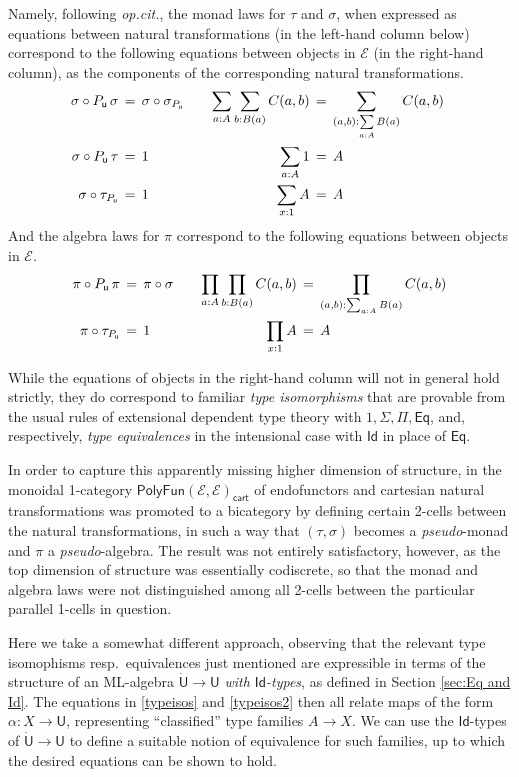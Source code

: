 \documentclass[12pt,reqno]{amsart}
\newcommand{\EE}{\ensuremath{\mathcal{E}}}
\renewcommand{\to}{\ensuremath{\rightarrow}}
\newcommand{\Id}{\mathsf{Id}}
\renewcommand{\t}{\ensuremath{\mathsf{u}}}
\newcommand{\T}{\ensuremath{\mathsf{U}}}
\newcommand{\TT}{\ensuremath{\dot{\mathsf{U}}}}
\theoremstyle{remark}
\theoremstyle{definition}
\begin{document}
Namely, following \emph{op.cit.}, the monad laws for $\tau$ and $\sigma$, when expressed as equations between natural transformations (in the left-hand column below) correspond to the following equations between objects in $\EE$ (in the right-hand column), as the components of the corresponding natural transformations.
\begin{align}\label{typeisos}\textstyle
 \sigma\circ P_\t\, \sigma\, &=\, \sigma\circ\sigma_{P_\t}	&&&	\sum\limits_{a:A}\sum\limits_{b:B(a)}C(a,b)\, &=\, \sum\limits_{(a,b):\sum\limits_{a:A}B(a)}C(a,b)\  \notag\\ 
  \sigma\circ P_\t\,\tau\, &=\, 1 		&&& 	\sum\limits_{a:A}1\, &=\, A  %
  \\ 
  \sigma\circ \tau_{P_\t}\, &=\, 1		&&& 	\sum\limits_{x:1}A\, &=\, A  \notag
 \end{align}
%
And the algebra laws for $\pi$ correspond to the following equations between objects in $\EE$.
%
\begin{align}\label{typeisos2}
 \pi\circ P_\t\,\pi\, &=\,  \pi\circ\sigma 	&&&	\prod\limits_{a:A}\prod\limits_{b:B(a)}C(a,b)\, 
 									&=\, \prod\limits_{(a,b):\sum_{a:A}B(a)}C(a,b)  \notag\\ 
 \pi\circ \tau_{P_\t}\, &=\, 1 	&&& 	\prod\limits_{x:1}A\, &=\, A  %
\end{align}

While the equations of objects in the right-hand column will not in general hold strictly, they do correspond to familiar \emph{type isomorphisms} that are provable from the usual rules of extensional dependent type theory with $1, \Sigma, \Pi, \mathsf{Eq}$, and, respectively, \emph{type equivalences} in the intensional case with $\mathsf{Id}$ in place of $\mathsf{Eq}$. 

In order to capture this apparently missing higher dimension of structure, in \cite{Newstead:thesis, NA:2018} the monoidal 1-category $\mathsf{PolyFun}(\EE, \EE)_{\mathsf{cart}}$ of endofunctors and cartesian natural transformations was promoted to a bicategory by defining certain 2-cells between the natural transformations, in such a way that $(\tau, \sigma)$ becomes a \emph{pseudo}-monad and $\pi$ a \emph{pseudo}-algebra.  The result was not entirely satisfactory, however, as the top dimension of structure was essentially codiscrete, so that the monad and algebra laws were not distinguished among all 2-cells between the particular parallel 1-cells in question.

Here we take a somewhat different approach, observing that the relevant type isomophisms resp.\ equivalences just mentioned are expressible in terms of the structure of an ML-algebra $\TT \to \T$ \emph{with $\Id{}$-types}, as defined in Section \ref{sec:Eq and Id}. The equations in \eqref{typeisos} and \eqref{typeisos2} 
 then all relate maps of the form $\alpha : X \to \T$, representing ``classified'' type families $A\to X$.  We can use the $\Id{}$-types of $\TT \to \T$ to define a suitable notion of equivalence for such families, up to which the desired equations can be shown to hold. 
\end{document}
